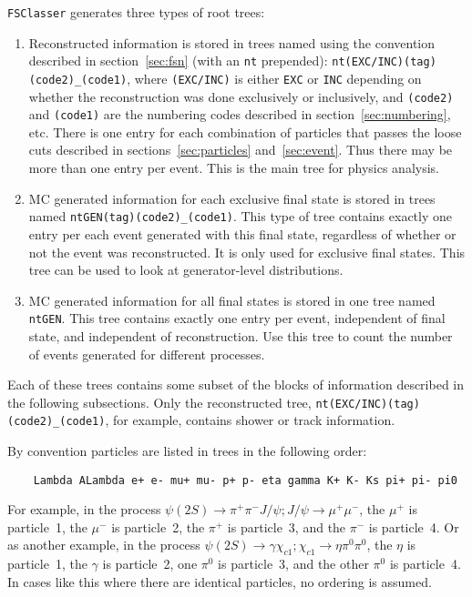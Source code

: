 \documentclass[11pt,a4paper]{define/cepcnote}
\begin{document}
{\tt FSClasser} generates three types of root trees:
\begin{enumerate}
\item{Reconstructed information is stored in trees named using the convention described in section~\ref{sec:fsn} (with an {\tt nt} prepended): {\tt nt(EXC/INC)(tag)(code2)\_(code1)}, where {\tt (EXC/INC)} is either {\tt EXC} or {\tt INC} depending on whether the reconstruction was done exclusively or inclusively, and {\tt (code2)} and {\tt (code1)} are the numbering codes described in section~\ref{sec:numbering}, etc. There is one entry for each combination of particles that passes the loose cuts described in sections~\ref{sec:particles} and~\ref{sec:event}. Thus there may be more than one entry per event.  This is the main tree for physics analysis.}
\item{MC generated information for each exclusive final state is stored in trees named {\tt ntGEN(tag)(code2)\_(code1)}.  This type of tree contains exactly one entry per each event generated with this final state, regardless of whether or not the event was reconstructed.  It is only used for exclusive final states.  This tree can be used to look at generator-level distributions.}
\item{MC generated information for all final states is stored in one tree named {\tt ntGEN}.  This tree contains exactly one entry per event, independent of final state, and independent of reconstruction.  Use this tree to count the number of events generated for different processes.}
\end{enumerate}


Each of these trees contains some subset of the blocks of information described in the following subsections.  Only the reconstructed tree, {\tt nt(EXC/INC)(tag)(code2)\_(code1)}, for example, contains shower or track information.

By convention particles are listed in trees in the following order:  
\begin{verbatim}
    Lambda ALambda e+ e- mu+ mu- p+ p- eta gamma K+ K- Ks pi+ pi- pi0
\end{verbatim}
For example, in the process $\psi(2S)\to\pi^+\pi^-J/\psi; J/\psi\to\mu^+\mu^-$, the $\mu^+$ is particle~1, the $\mu^-$ is particle~2, the $\pi^+$ is particle~3, and the $\pi^-$ is particle~4. Or as another example, in the process $\psi(2S)\to\gamma\chi_{c1}; \chi_{c1}\to\eta\pi^0\pi^0$, the $\eta$ is particle~1, the $\gamma$ is particle~2, one $\pi^0$ is particle~3, and the other $\pi^0$ is particle~4.  In cases like this where there are identical particles, no ordering is assumed.
\end{document}
